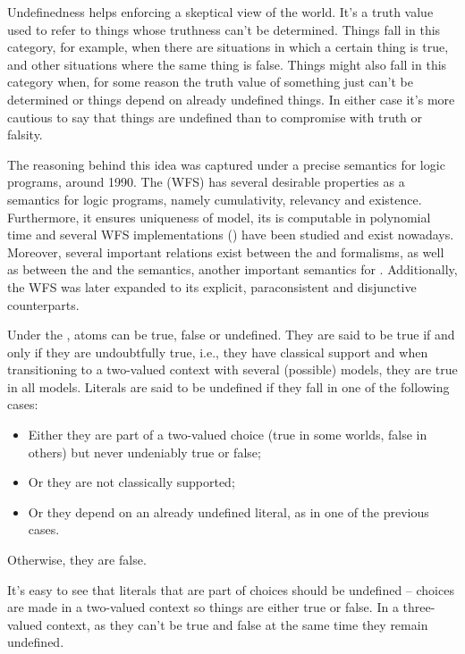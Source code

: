 Undefinedness helps enforcing a skeptical view of the world. It's a truth value used to refer to things whose truthness can't be determined. Things fall in this category, for example, when there are situations in which a certain thing is true, and other situations where the same thing is false. Things might also fall in this category when, for some reason the truth value of something just can't be determined or things depend on already undefined things. In either case it's more cautious to say that things are undefined than to compromise with truth or falsity.

The reasoning behind this idea was captured under a precise semantics for logic programs, around 1990. The \WFS\cite{wfsMain}(WFS) has several desirable properties as a semantics for logic programs, namely cumulativity, relevancy and existence. Furthermore, it ensures uniqueness of model, its \wfm is computable in polynomial time and several WFS implementations (\cite{xsbSite,xsbArticle,branchBound,alternatingFixpoint}) have been studied and exist nowadays. Moreover, several important relations exist between the \wfs and \nmr formalisms\cite{wfsDualities,wfsGeneralized}, as well as between the \wfs and the \sms semantics\cite{wfsCoincides,wfsRelation}, another important semantics for \nmr. Additionally, the WFS was later expanded to its explicit\cite{jjaPhD,wfsxArticle}, paraconsistent\cite{paraconsistentArticle} and disjunctive\cite{alcantaraPhD} counterparts.

Under the \wfs, atoms can be true, false or undefined. They are said to be true if and only if they are undoubtfully true, i.e., they have classical support and when transitioning to a two-valued context with several (possible) models, they are true in all models. Literals are said to be undefined if they fall in one of the following cases:

\begin{itemize}
	\item Either they are part of a two-valued choice (true in some worlds, false in others) but never undeniably true or false;
	\item Or they are not classically supported;
	\item Or they depend on an already undefined literal, as in one of the previous cases.
\end{itemize}

Otherwise, they are false.

It's easy to see that literals that are part of choices should be undefined -- choices are made in a two-valued context so things are either true or false. In a three-valued context, as they can't be true and false at the same time they remain undefined. 

